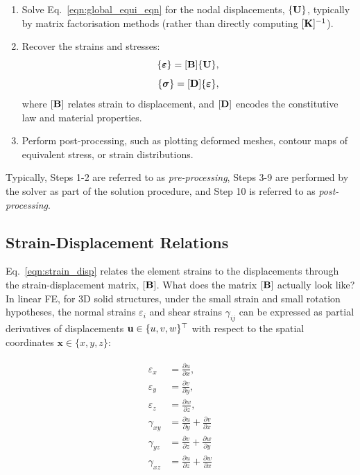 \documentclass[12pt, a4paper]{article}
\numberwithin{equation}{section}
\begin{document}
\begin{enumerate}
    \item Solve Eq.~\eqref{eqn:global_equi_eqn} for the nodal displacements, $\{\mathbf{U}\}$, typically by matrix factorisation methods (rather than directly computing $[\mathbf{K}]^{-1}$).

    \item Recover the strains and stresses:
    \begin{equation}
    \label{eqn:strain_disp}
        \{\boldsymbol{\varepsilon}\} = [\mathbf{B}] \{\mathbf{U}\},
    \end{equation}
    \begin{equation}
        \{\boldsymbol{\sigma}\} = [\mathbf{D}] \{\boldsymbol{\varepsilon}\},
    \end{equation}
    where $[\mathbf{B}]$ relates strain to displacement, and $[\mathbf{D}]$ encodes the constitutive law and material properties.

    \item Perform post-processing, such as plotting deformed meshes, contour maps of equivalent stress, or strain distributions.
\end{enumerate}

Typically, Steps 1-2 are referred to as \textit{pre-processing}, Steps 3-9 are performed by the solver as part of the solution procedure, and Step 10 is referred to as \textit{post-processing}.

\newpage
\subsection{Strain-Displacement Relations}

Eq.~\eqref{eqn:strain_disp} relates the element strains to the displacements through the strain-displacement matrix, $[\mathbf{B}]$. What does the matrix $[\mathbf{B}]$ actually look like? \\

In linear FE, for 3D solid structures, under the small strain and small rotation hypotheses, the normal strains $\varepsilon_i$ and shear strains $\gamma_{ij}$ can be expressed as partial derivatives of displacements $\mathbf{u} \in \{u, v, w\}^\top$ with respect to the spatial coordinates $\mathbf{x} \in \{x, y, z\}$:

\begin{align}
\label{eqn:strain_tensor_components}
\begin{split}
    \varepsilon_x &= \frac{\partial u}{\partial x}, \\[.5em]
    \varepsilon_y &= \frac{\partial v}{\partial y}, \\[.5em]
    \varepsilon_z &= \frac{\partial w}{\partial z}, \\[.5em]
    \gamma_{xy} &= \frac{\partial u}{\partial y} + \frac{\partial v}{\partial x} \\[.5em]
    \gamma_{yz} &= \frac{\partial v}{\partial z} + \frac{\partial w}{\partial y} \\[.5em]
    \gamma_{xz} &= \frac{\partial u}{\partial z} + \frac{\partial w}{\partial x}
\end{split}
\end{align}
\end{document}
